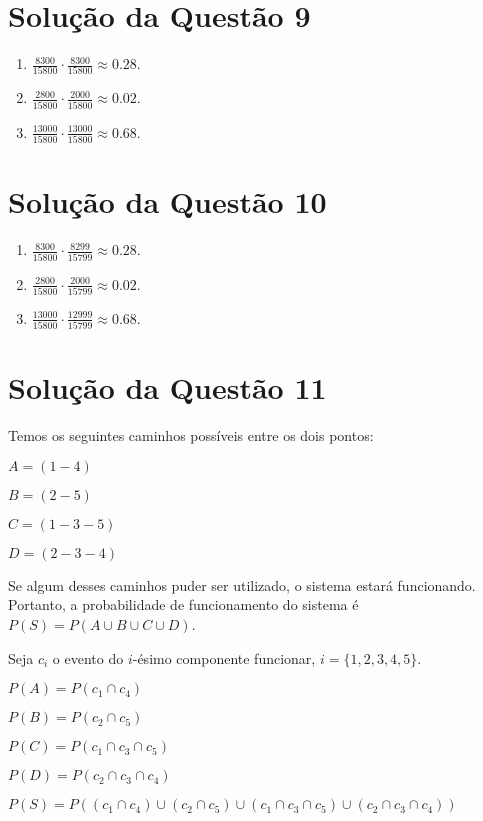 \documentclass[
	12pt,				%
	openright,			%
	twoside,			%
	a4paper,			%
	english,			%
	french,				%
	spanish,			%
	brazil,				%
	]{abntex2}
\begin{document}
\section{Solução da Questão 9}
\begin{enumerate}[label=\alph*)]
    \item $\frac{8300}{15800}\cdot\frac{8300}{15800} \approx 0.28.$
    \item $\frac{2800}{15800}\cdot\frac{2000}{15800} \approx 0.02.$
    \item $\frac{13000}{15800}\cdot\frac{13000}{15800} \approx 0.68.$
\end{enumerate}
\section{Solução da Questão 10}
\begin{enumerate}[label=\alph*)]
    \item $\frac{8300}{15800}\cdot\frac{8299}{15799} \approx 0.28.$
    \item $\frac{2800}{15800}\cdot\frac{2000}{15799} \approx 0.02.$
    \item $\frac{13000}{15800}\cdot\frac{12999}{15799} \approx 0.68.$
\end{enumerate}

\section{Solução da Questão 11}
Temos os seguintes caminhos possíveis entre os dois pontos:

$A = (1-4)$

$B = (2-5)$

$C = (1-3-5)$

$D = (2-3-4)$

Se algum desses caminhos puder ser utilizado, o sistema estará funcionando. Portanto, a probabilidade de funcionamento do sistema é $P(S) = P(A \cup B \cup C \cup D)$.

Seja $c_i$ o evento do $i$-ésimo componente funcionar, $i = \{1, 2, 3, 4, 5\}$.

$P(A) = P(c_1 \cap c_4)$

$P(B) = P(c_2 \cap c_5)$

$P(C) = P(c_1 \cap c_3 \cap c_5)$

$P(D) = P(c_2 \cap c_3 \cap c_4)$

$P(S) = P((c_1 \cap c_4) \cup (c_2 \cap c_5) \cup (c_1 \cap c_3 \cap c_5) \cup (c_2 \cap c_3 \cap c_4))$
\end{document}
